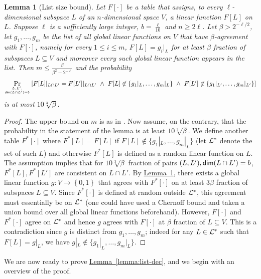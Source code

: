 \documentclass[11pt]{article}
\numberwithin{equation}{section}
\newtheorem{lemma}[theorem]{Lemma}
\theoremstyle{definition}
\theoremstyle{plain}
\newcommand{\expref}[2]{\hyperref[#2]{#1~\ref{#2}}}
\newcommand\set[1]{{\left\{ #1 \right\}}}
\newcommand\Prob[2]{{\Pr_{#1}\left[ {#2} \right]}}
\newcommand\power[1]{\set{0,1}^{#1}}
\renewcommand\geq{\geqslant}
\renewcommand\leq{\leqslant}
\begin{document}
\begin{lemma}[List size bound] \label{lemma:lin-aux-2} Let $F[\cdot]$ be a table that assigns, to every $\ell$-dimensional subspace $L$ of an $n$-dimensional space $V$, a linear
function $F[L]$ on $L$. Suppose $\ell$ is a sufficiently large
integer, $b = \frac{\ell}{10}$ and $n \geq 2\ell$.
Let $\beta>2^{-\ell/2}$, let $g_1, \ldots,
g_m$ be the list of all global linear functions on $V$ that have
$\beta$-agreement with $F[\cdot]$, namely
for every $1 \leq i \leq m$, $F[L] = g_i|_L$ for at least $\beta$ fraction of subspaces $L \subseteq V$ and moreover every such global linear
function appears in the list. Then $m \leq \frac{\beta}{\beta^2- 2^{-\ell}}$ and  the probability
 $$ \Prob{L, L', \atop{ {\sf dim}(L \cap L')=b } }{F[L]|_{L \cap L'} = F[L']|_{L\cap L'} ~\wedge ~F[L]\not\in \{  g_1|_L, \ldots, g_m|_L\}
 ~\wedge ~F[L']\not\in \{  g_1|_{L'}, \ldots, g_m|_{L'} \} } $$ is at most $10 \sqrt[3]{\beta}.$
\end{lemma}
\begin{proof}
 The upper bound on $m$ is as in \cite[Theorem 2.6]{KMS}. Now assume, on the contrary, that the probability in the statement of the lemma is at least $10 \sqrt[3]{\beta}.$  We define
 another table $F^*[\cdot]$ where $F^*[L] = F[L]$ if $F[L] \not\in \{ g_1|_L,\ldots, g_m|_L\}$ (let ${\cal L}^*$ denote the set of such $L$)
 and otherwise $F^*[L]$ is defined as a random linear function on
 $L$. The assumption implies that for $10 \sqrt[3]{\beta}$ fraction of pairs $(L, L'), {\sf dim}(L\cap L')=b$, $F^*[L], F^*[L']$ are consistent on $L \cap L'$. By \expref{Lemma}{lemma:lin-aux-2},
 there exists a global linear function $g:V \to \power{}$ that agrees with $F^*[\cdot]$ on at least $3\beta$ fraction of subspaces $L \subseteq V$. Since
 $F^*[\cdot]$ is defined at random outside ${\cal L}^*$, this agreement must essentially be on ${\cal L}^*$ (one could have used a Chernoff bound and taken a union bound
 over all global linear functions beforehand). However, $F[\cdot]$ and $F^*[\cdot]$ agree on ${\cal L}^*$ and hence $g$ agrees with $F[\cdot]$ at $\beta$
 fraction of $L \subseteq V$. This is a contradiction since $g$ is distinct from $g_1,\ldots, g_m$; indeed for any $L \in {\cal L}^*$ such that $F[L] = g|_L$, we have
 $g|_L \not\in \{g_1|_L, \ldots, g_m|_L \}$.
\end{proof}

We are now ready to prove \expref{Lemma}{lemma:list-dec}, and we begin with an overview of the proof.

%
\end{document}
